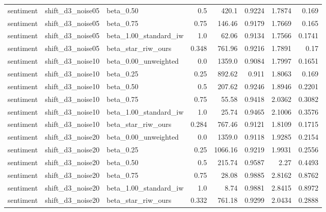 \begin{table}[htbp]
{\begin{tabular}{lllrrrrr}
sentiment & shift\_d3\_noise05 & beta\_0.50 & 0.5 & 420.1 & 0.9224 & 1.7874 & 0.169 \\
sentiment & shift\_d3\_noise05 & beta\_0.75 & 0.75 & 146.46 & 0.9179 & 1.7669 & 0.165 \\
sentiment & shift\_d3\_noise05 & beta\_1.00\_standard\_iw & 1.0 & 62.06 & 0.9134 & 1.7566 & 0.1741 \\
sentiment & shift\_d3\_noise05 & beta\_star\_riw\_ours & 0.348 & 761.96 & 0.9216 & 1.7891 & 0.17 \\
sentiment & shift\_d3\_noise10 & beta\_0.00\_unweighted & 0.0 & 1359.0 & 0.9084 & 1.7997 & 0.1651 \\
sentiment & shift\_d3\_noise10 & beta\_0.25 & 0.25 & 892.62 & 0.911 & 1.8063 & 0.169 \\
sentiment & shift\_d3\_noise10 & beta\_0.50 & 0.5 & 207.62 & 0.9246 & 1.8946 & 0.2201 \\
sentiment & shift\_d3\_noise10 & beta\_0.75 & 0.75 & 55.58 & 0.9418 & 2.0362 & 0.3082 \\
sentiment & shift\_d3\_noise10 & beta\_1.00\_standard\_iw & 1.0 & 25.74 & 0.9465 & 2.1006 & 0.3576 \\
sentiment & shift\_d3\_noise10 & beta\_star\_riw\_ours & 0.284 & 767.46 & 0.9121 & 1.8109 & 0.1715 \\
sentiment & shift\_d3\_noise20 & beta\_0.00\_unweighted & 0.0 & 1359.0 & 0.9118 & 1.9285 & 0.2154 \\
sentiment & shift\_d3\_noise20 & beta\_0.25 & 0.25 & 1066.16 & 0.9219 & 1.9931 & 0.2556 \\
sentiment & shift\_d3\_noise20 & beta\_0.50 & 0.5 & 215.74 & 0.9587 & 2.27 & 0.4493 \\
sentiment & shift\_d3\_noise20 & beta\_0.75 & 0.75 & 28.08 & 0.9885 & 2.8162 & 0.8762 \\
sentiment & shift\_d3\_noise20 & beta\_1.00\_standard\_iw & 1.0 & 8.74 & 0.9881 & 2.8415 & 0.8972 \\
sentiment & shift\_d3\_noise20 & beta\_star\_riw\_ours & 0.332 & 761.18 & 0.9299 & 2.0434 & 0.2888 \\
\bottomrule
\end{tabular}%
}
\end{table}